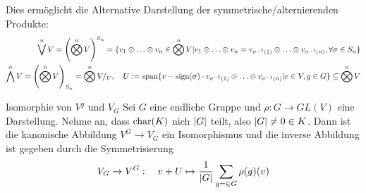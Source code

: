 Dies ermöglicht die Alternative Darstellung der symmetrische/alternierenden Produkte:
\begin{align*}
    \bigvee^nV = \left(\bigotimes^n V\right)^{S_n} = \{v_1 \otimes \ldots \otimes v_n \in \bigotimes^n V | v_1 \otimes \ldots \otimes v_n = v_{\sigma^{-1}(1)} \otimes \ldots \otimes v_{\sigma^{-1}(n)}, \forall \sigma \in S_n\}\\
    \bigwedge^n V = \left(\bigotimes^nV\right)_{S_n} = \bigotimes^nV/_{U}, \quad U := \operatorname{span}\{v - \text{sign}(\sigma) \cdot v_{\sigma^{-1}(1)} \otimes \ldots \otimes v_{\sigma^{-1}(n)} | v \in V, g \in G\} \subseteq \bigotimes^nV
\end{align*}

\begin{satz}{Isomorphie von $V^g$ und $V_G$}
    Sei $G$ eine endliche Gruppe und $\rho: G \to GL(V)$ eine Darstellung. Nehme an, dass $\operatorname{char}(K)$ nich $\vert G\vert$ teilt, also $\vert G\vert \neq 0 \in K$. Dann ist die kanonische Abbildung $V^G \to V_G$ ein Isomorphismus und die inverse Abbildung ist gegeben durch die Symmetrisierung
    \begin{align*}
        V_G \to V^G: \quad v + U \mapsto \frac{1}{\vert G\vert} \sum_{g = \in G} \rho(g)(v)
    \end{align*}  
\end{satz}


